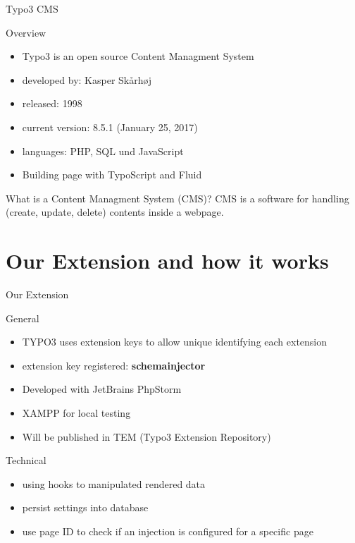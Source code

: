 \documentclass{beamer}
\begin{document}
\begin{frame}{Typo3 CMS}
	\begin{block}{Overview}
		\begin{itemize}
			\item Typo3 is an open source Content Managment System
			\item developed by: Kasper Skårhøj
			\item released: 1998
			\item current version: 8.5.1 (January 25, 2017)
			\item languages: PHP, SQL und JavaScript
			\item Building page with TypoScript and Fluid
		\end{itemize}
	\end{block}
	
	\begin{block}{What is a Content Managment System (CMS)?}
		CMS is a software for handling (create, update, delete) contents inside a webpage.
	\end{block}

\end{frame}

\section{Our Extension and how it works}
\begin{frame}{Our Extension}
	\begin{block}{General}
		\begin{itemize}
			\item TYPO3 uses extension keys to allow unique identifying each extension
			\item extension key registered:  \textbf{schema\textunderscore injector}
			\item Developed with JetBrains PhpStorm
			\item XAMPP for local testing
			\item Will be published in TEM (Typo3 Extension Repository)
		\end{itemize}
	\end{block}
	
	\begin{block}{Technical}
		\begin{itemize}
			\item using hooks to manipulated rendered data
			\item persist settings into database
			\item use page ID to check if an injection is configured for a specific page
		\end{itemize}
	\end{block}
\end{frame}
\end{document}

